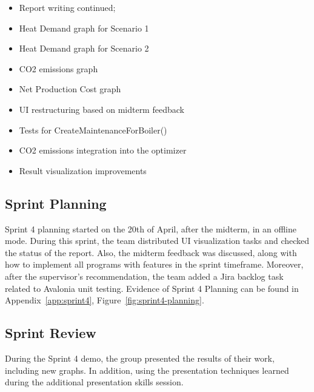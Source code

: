  \begin{itemize}

    \item  Report writing continued;
    
    \item  Heat Demand graph for Scenario 1

    \item  Heat Demand graph for Scenario 2

    \item  CO2 emissions graph

    \item  Net Production Cost graph

    \item UI restructuring based on midterm feedback

    \item  Tests for CreateMaintenanceForBoiler()

    \item  CO2 emissions integration into the optimizer

    \item  Result visualization improvements

\end{itemize}


 

\subsection*{Sprint Planning}

Sprint 4 planning started on the 20th of April, after the midterm, in an offline mode. During this sprint, the team distributed UI visualization tasks and checked the status of the report. Also, the midterm feedback was discussed, along with how to implement all programs with features in the sprint timeframe. Moreover, after the supervisor’s recommendation, the team added a Jira backlog task related to Avalonia unit testing. Evidence of Sprint 4 Planning can be found in Appendix~\ref{app:sprint4}, Figure~\ref{fig:sprint4-planning}.

 

\subsection*{Sprint Review}

During the Sprint 4 demo, the group presented the results of their work, including new graphs. In addition, using the presentation techniques learned during the additional presentation skills session.

